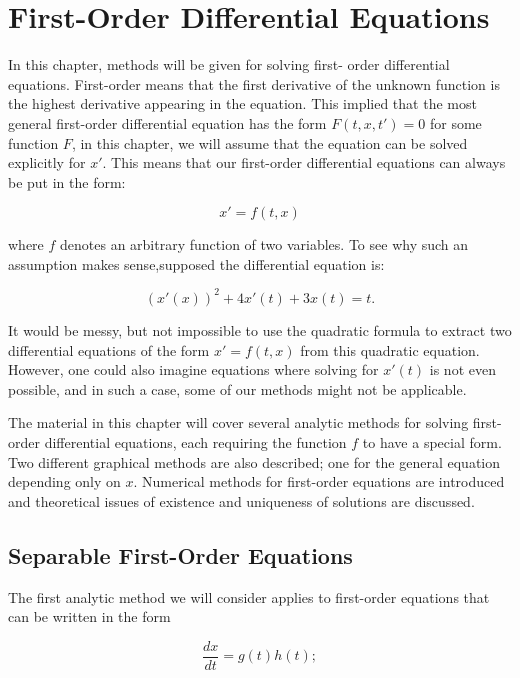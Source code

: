 \chapter{First-Order Differential Equations}

In this chapter, methods will be given for solving first- order differential equations. First-order means that the first derivative of the unknown function is the highest derivative appearing in the equation. This implied that the most general first-order differential equation has the form $F(t,x,t')=0$ for some function $F$, in this chapter, we will assume that the equation can be solved explicitly for $x'$. This means that our first-order differential equations can always be put in the form:

\begin{equation}
  x'=f(t,x)
\end{equation}

where $f$ denotes an arbitrary function of two variables. To see why such an assumption makes sense,supposed the differential equation is:

\begin{equation}
  (x'(x))^2+4x'(t)+3x(t)=t.
\end{equation}

It would be messy, but not impossible to use the quadratic formula to extract two differential equations of the form $x'=f(t,x)$ from this quadratic equation. However, one could also imagine equations where solving for $x'(t)$ is not even possible, and in such a case, some of our methods might not be applicable.

The material in this chapter will cover several analytic methods for solving first-order differential equations, each requiring the function $f$ to have a special form. Two different graphical methods are also described; one for the general equation depending only on $x$. Numerical methods for first-order equations are introduced and theoretical issues of existence and uniqueness of solutions are discussed.

\section{Separable First-Order Equations}

  The first analytic method we will consider applies to first-order equations that can be written in the form

  \begin{equation}
    \frac{dx}{dt} = g(t)h(t);
  \end{equation}

